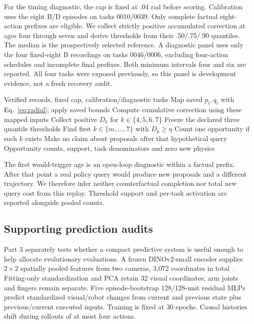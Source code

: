 \documentclass[sigconf,dvipsnames]{acmart}
\begin{document}
For the timing diagnostic, the cap is fixed at .04 rad before scoring. Calibration
uses the eight B/D episodes on tasks 0010/0039. Only complete factual eight-action
prefixes are eligible. We collect strictly positive accumulated correction at ages
four through seven and derive thresholds from their .50/.75/.90 quantiles. The
median is the prospectively selected reference. A diagnostic panel uses only the
four fixed-eight B recordings on tasks 0046/0006, excluding four-action schedules
and incomplete final prefixes. Both minimum intervals four and six are reported.
All four tasks were exposed previously, so this panel is development evidence,
not a fresh recovery audit.

\begin{algorithm}[t]
\caption{Saved-trace trigger-opportunity diagnostic}
\label{alg:replay}
\begin{algorithmic}[1]
\Require Verified records, fixed cap, calibration/diagnostic tasks
  \State Map saved $p_t,q_t$ with Eq.~\eqref{eq:radial}; apply saved bounds
  \State Compute cumulative correction using these mapped inputs
  \State Collect positive $D_k$ for $k\in\{4,5,6,7\}$
\EndFor
\State Freeze the declared three quantile thresholds
  \State Find first $k\in\{m,\ldots,7\}$ with $D_k\ge\eta$
  \State Count one opportunity if such $k$ exists
  \State Make no claim about proposals after that hypothetical query
\EndFor
\Ensure Opportunity counts, support, task denominators and zero new physics
\end{algorithmic}
\end{algorithm}

The first would-trigger age is an open-loop diagnostic within a factual prefix.
After that point a real policy query would produce new proposals and a different
trajectory. We therefore infer neither counterfactual completion nor total new
query cost from this replay. Threshold support and per-task activation are reported
alongside pooled counts.

\subsection{Supporting prediction audits}
Part 3 separately tests whether a compact predictive system is useful enough to
help allocate evolutionary evaluations. A frozen DINOv2-small encoder supplies
$2\times2$ spatially pooled features from two cameras, 3,072 coordinates
in total~\cite{dinov2}. Fitting-only standardization and PCA retain 32 visual
coordinates; arm joints and fingers remain separate. Five episode-bootstrap
128/128-unit residual MLPs predict standardized visual/robot changes from current
and previous state plus previous/current executed inputs. Training is fixed at
30 epochs. Causal histories shift during rollouts of at most four actions.
\end{document}
